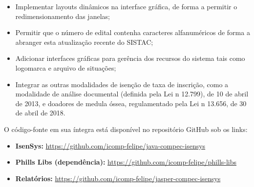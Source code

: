 \documentclass[
	12pt,			%
	openright,		%
	oneside,	
	a4paper,		%
	english,		%
	brazil			%
]{abntex2/abntex2}  %
\begin{document}
			\begin{itemize}
				
				\item Implementar layouts dinâmicos na interface gráfica, de forma a permitir o redimensionamento das janelas;
				\item Permitir que o número de edital contenha caracteres alfanuméricos de forma a abranger esta atualização recente do SISTAC;
				\item Adicionar interfaces gráficas para gerência dos recursos do sistema tais como logomarca e arquivo de situações;
				\item Integrar as outras modalidades de isenção de taxa de inscrição, como a modalidade de análise documental (definida pela Lei n{\textdegree} 12.799), de 10 de abril de 2013, e doadores de medula óssea, regulamentado pela Lei n{\textdegree} 13.656, de 30 de abril de 2018.
				
			\end{itemize}
			
			O código-fonte em sua íntegra está disponível no repositório GitHub sob os links:
			
			\begin{itemize}
				
				\item \textbf{IsenSys:} \url{https://github.com/icomp-felipe/java-compec-isensys}
				\item \textbf{Phills Libs (dependência):} \url{https://github.com/icomp-felipe/phills-libs}
				\item \textbf{Relatórios:} \url{https://github.com/icomp-felipe/jasper-compec-isensys}
				
			\end{itemize}

\postextual
{}

\end{document}

